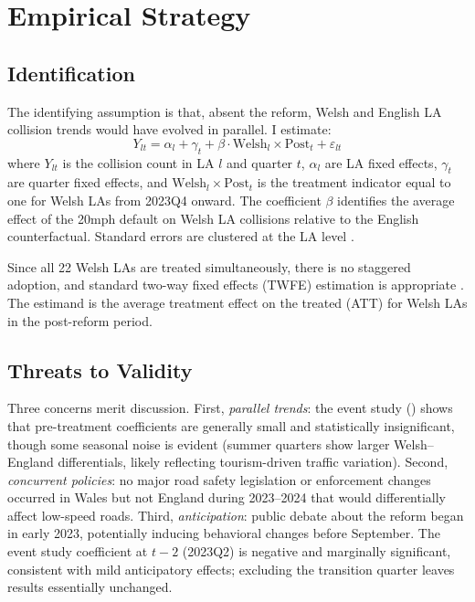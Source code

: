 \documentclass[12pt]{article}
\begin{document}
\section{Empirical Strategy}

\subsection{Identification}

The identifying assumption is that, absent the reform, Welsh and English LA collision trends would have evolved in parallel. I estimate:
\begin{equation}
Y_{lt} = \alpha_l + \gamma_t + \beta \cdot \text{Welsh}_l \times \text{Post}_t + \varepsilon_{lt}
\label{eq:did}
\end{equation}
where $Y_{lt}$ is the collision count in LA $l$ and quarter $t$, $\alpha_l$ are LA fixed effects, $\gamma_t$ are quarter fixed effects, and $\text{Welsh}_l \times \text{Post}_t$ is the treatment indicator equal to one for Welsh LAs from 2023Q4 onward. The coefficient $\beta$ identifies the average effect of the 20mph default on Welsh LA collisions relative to the English counterfactual. Standard errors are clustered at the LA level \citep{bertrand2004much, abadie2023should}.

Since all 22 Welsh LAs are treated simultaneously, there is no staggered adoption, and standard two-way fixed effects (TWFE) estimation is appropriate \citep{goodmanbacon2021, roth2023parallel}. The estimand is the average treatment effect on the treated (ATT) for Welsh LAs in the post-reform period.

\subsection{Threats to Validity}

Three concerns merit discussion. First, \emph{parallel trends}: the event study () shows that pre-treatment coefficients are generally small and statistically insignificant, though some seasonal noise is evident (summer quarters show larger Welsh--England differentials, likely reflecting tourism-driven traffic variation). Second, \emph{concurrent policies}: no major road safety legislation or enforcement changes occurred in Wales but not England during 2023--2024 that would differentially affect low-speed roads. Third, \emph{anticipation}: public debate about the reform began in early 2023, potentially inducing behavioral changes before September. The event study coefficient at $t-2$ (2023Q2) is negative and marginally significant, consistent with mild anticipatory effects; excluding the transition quarter leaves results essentially unchanged.
\end{document}

